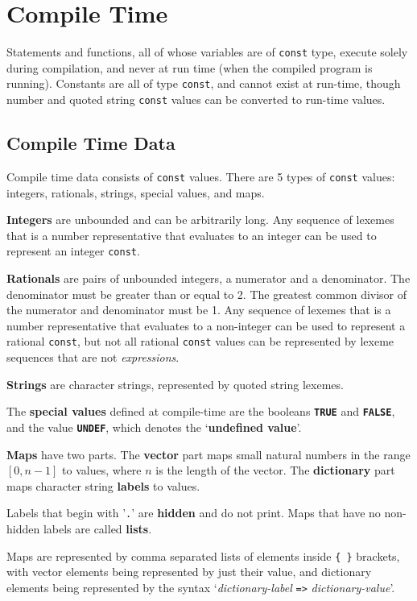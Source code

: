 \documentclass[12pt]{article}
\newcommand{\key}[1]{{\rm \bfseries #1}}
\newcommand{\ttkey}[1]{{\tt \bfseries #1}}
\begin{document}
\section{Compile Time}

Statements and functions, all of whose variables are of {\tt const}
type, execute solely during compilation, and never at run time
(when the compiled program is running).  Constants are all of
type {\tt const}, and cannot exist at run-time, though number
and quoted string {\tt const} values can be converted to run-time values.

\subsection{Compile Time Data}

Compile time data consists of {\tt const} values.
There are 5 types of {\tt const} values: integers, rationals, strings,
special values, and maps.

\key{Integers} are unbounded and can be arbitrarily long.
Any sequence of lexemes that is a
number representative
that evaluates to an integer
can be used to represent an integer {\tt const}.

\key{Rationals} are pairs of unbounded integers, a numerator and a denominator.
The denominator must be greater than or equal to 2.  The greatest common divisor
of the numerator and denominator must be 1.
Any sequence of lexemes that is a
number representative
that evaluates to a non-integer
can be used to represent a rational {\tt const}, but not all
rational {\tt const} values can be represented by lexeme sequences
that are not {\em expressions}.

\key{Strings} are character strings, represented by quoted string lexemes.

The \key{special values} defined at compile-time are the booleans
\ttkey{TRUE} and \ttkey{FALSE}, and the value \ttkey{UNDEF},
which denotes the `\key{undefined value}'.

\key{Maps} have two parts.  The \key{vector} part maps small
natural numbers in the range $[0,n-1]$ to values, where $n$
is the length of the vector.  The \key{dictionary} part maps
character string \key{labels} to values.

Labels that begin with '{\tt .}' are \key{hidden} and do not
print.  Maps that have no non-hidden labels are called \key{lists}.

Maps are represented by comma separated lists of elements inside
{\tt \{~\}} brackets, with vector elements being represented by
just their value, and dictionary elements being represented
by the syntax `{\em dictionary-label} {\tt =>} {\em dictionary-value}'.
\end{document}
